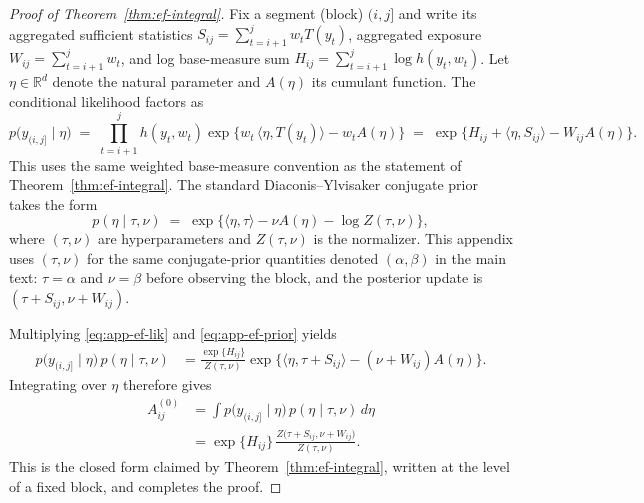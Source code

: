 \begin{proof}[Proof of Theorem~\ref{thm:ef-integral}]
Fix a segment (block) $(i,j]$ and write its aggregated sufficient statistics
$S_{ij}=\sum_{t=i+1}^j w_t T(y_t)$, aggregated exposure
$W_{ij}=\sum_{t=i+1}^j w_t$, and log base-measure sum
$H_{ij}=\sum_{t=i+1}^j \log h(y_t,w_t)$.
Let $\eta\in\mathbb{R}^d$ denote the natural parameter and $A(\eta)$ its cumulant function.
The conditional likelihood factors as
\begin{equation}
 p\big(y_{(i,j]}\mid \eta\big)
 \;=\; \prod_{t=i+1}^j h(y_t,w_t)\exp\big\{ w_t\,\langle \eta, T(y_t)\rangle - w_t A(\eta)\big\}
 \;=\; \exp\big\{H_{ij}+\langle \eta, S_{ij}\rangle - W_{ij}A(\eta)\big\}.
 \label{eq:app-ef-lik}
\end{equation}
This uses the same weighted base-measure convention as the statement of Theorem~\ref{thm:ef-integral}.
The standard Diaconis--Ylvisaker conjugate prior takes the form
\begin{equation}
 p(\eta\mid \tau,\nu) \;=\; \exp\big\{\langle \eta,\tau\rangle - \nu A(\eta) - \log Z(\tau,\nu)\big\},
 \label{eq:app-ef-prior}
\end{equation}
where $(\tau,\nu)$ are hyperparameters and $Z(\tau,\nu)$ is the normalizer. This appendix uses
$(\tau,\nu)$ for the same conjugate-prior quantities denoted $(\alpha,\beta)$ in the main text:
$\tau=\alpha$ and $\nu=\beta$ before observing the block, and the posterior update is
$(\tau+S_{ij},\nu+W_{ij})$.

Multiplying \eqref{eq:app-ef-lik} and \eqref{eq:app-ef-prior} yields
\begin{align}
 p\big(y_{(i,j]}\mid \eta\big)\,p(\eta\mid\tau,\nu)
 &= \frac{\exp\{H_{ij}\}}{Z(\tau,\nu)}
 \exp\Big\{\langle \eta, \tau+S_{ij}\rangle - (\nu+W_{ij})A(\eta)\Big\}.
\end{align}
Integrating over $\eta$ therefore gives
\begin{align}
 A^{(0)}_{ij}
 &= \int p\big(y_{(i,j]}\mid \eta\big)\,p(\eta\mid\tau,\nu)\,d\eta \\
 &= \exp\{H_{ij}\}\,\frac{Z\big(\tau+S_{ij},\nu+W_{ij}\big)}{Z(\tau,\nu)}.
 \label{eq:app-evidence}
\end{align}
This is the closed form claimed by Theorem~\ref{thm:ef-integral}, written at the level of a fixed block, and completes the proof. \end{proof}


